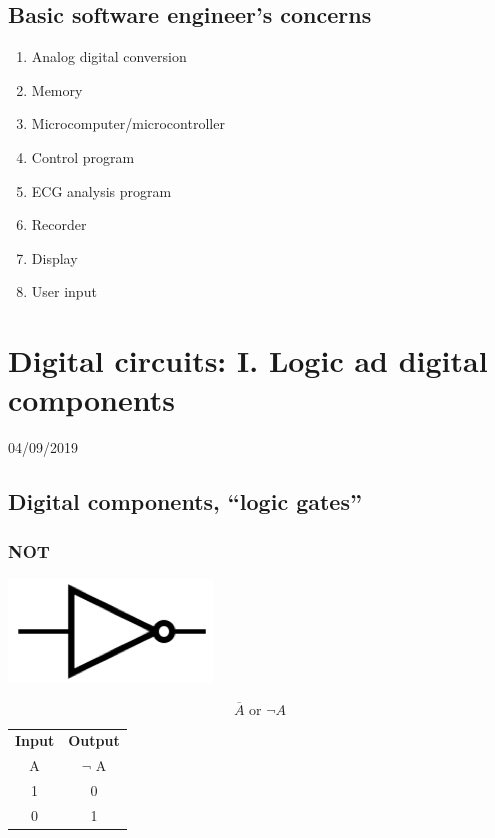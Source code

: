 \documentclass[11pt]{book}
\begin{document}
\section{Basic software engineer's concerns}
\begin{enumerate}
	\item Analog digital conversion
	\item Memory
	\item Microcomputer/microcontroller
	\item Control program
	\item ECG analysis program
	\item Recorder
	\item Display
	\item User input
\end{enumerate}

\chapter{Digital circuits: I. Logic ad digital components}
04/09/2019 
\minitoc
\newpage

\section{Digital components, ``logic gates''}
\subsection{NOT}
\begin{center}
	\includegraphics{figures/20.01.png}
\end{center}
\begin{equation}
	\overline{A} \text{ or } \neg A
\end{equation}
\begin{center}
	\begin{tabular}{c c}
		\textbf{Input} & \textbf{Output} \\
		A & $\neg$ A \\
		1 & 0 \\
		0 & 1\\
	\end{tabular}
\end{center}
\end{document}
